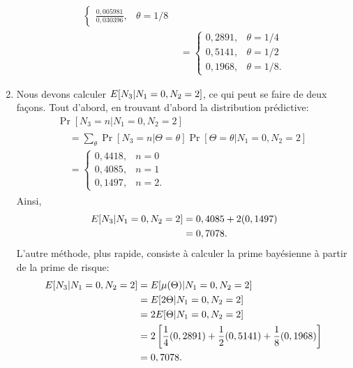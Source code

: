 \begin{exercice}
\begin{sol}
\begin{enumerate}
\begin{align*}
\begin{cases}
          \frac{0,005981}{0,030396}, & \theta = 1/8
        \end{cases} \\
        &=
        \begin{cases}
          0,2891, & \theta = 1/4 \\
          0,5141, & \theta = 1/2 \\
          0,1968, & \theta = 1/8.
        \end{cases}
      \end{align*}
    \item Nous devons calculer $E [ N_3|N_1 = 0, N_2 = 2 ]$, ce qui
      peut se faire de deux façons. Tout d'abord, en trouvant d'abord
      la distribution prédictive:
      \begin{multline*}
        \Pr[N_3 = n|N_1 = 0, N_2 = 2] \\
        \begin{split}
          &= \sum_\theta \Pr[N_3 = n|\Theta = \theta] \Pr[\Theta =
          \theta|N_1 = 0, N_2 = 2] \\
          &=
          \begin{cases}
            0,4418, & n = 0 \\
            0,4085, & n = 1 \\
            0,1497, & n = 2.
          \end{cases}
        \end{split}
      \end{multline*}
      Ainsi,
      \begin{align*}
        E [ N_3|N_1 = 0, N_2 = 2 ]
        &= 0,4085 + 2 (0,1497) \\
        &= 0,7078.
      \end{align*}
      L'autre méthode, plus rapide, consiste à calculer la prime
      bayésienne à partir de la prime de risque:
      \begin{align*}
        E [ N_3|N_1 = 0, N_2 = 2 ]
        &= E [ \mu(\Theta)|N_1 = 0, N_2 = 2 ] \\
        &= E [ 2 \Theta|N_1 = 0, N_2 = 2 ] \\
        &= 2 E [ \Theta|N_1 = 0, N_2 = 2 ] \\
        &= 2
        \left[
          \frac{1}{4} (0,2891) + \frac{1}{2} (0,5141) +
          \frac{1}{8} (0,1968)
        \right] \\
        &= 0,7078.
      \end{align*}
    \end{enumerate}
  \end{sol}
\end{exercice}

